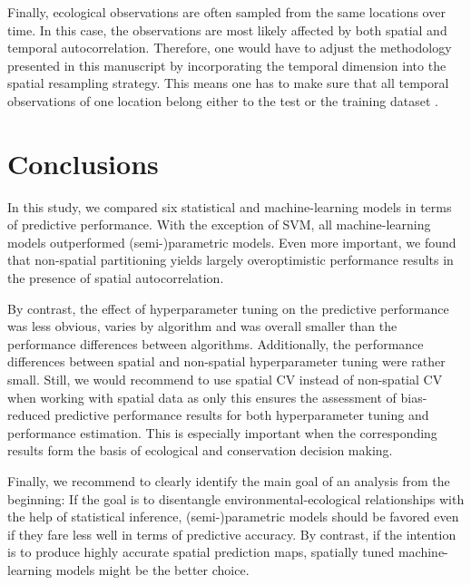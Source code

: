 \documentclass[review]{elsarticle}
\begin{document}
Finally, ecological observations are often sampled from the same locations over time.
In this case, the observations are most likely affected by both spatial and temporal autocorrelation.
Therefore, one would have to adjust the methodology presented in this manuscript by incorporating the temporal dimension into the spatial resampling strategy.
This means one has to make sure that all temporal observations of one location belong either to the test or the training dataset \citep{Meyer2018}.

\section{Conclusions}

\noindent In this study, we compared six statistical and machine-learning models in terms of predictive performance.
With the exception of SVM, all machine-learning models outperformed (semi-)parametric models.
Even more important, we found that non-spatial partitioning yields largely overoptimistic performance results in the presence of spatial autocorrelation.

By contrast, the effect of hyperparameter tuning on the predictive performance was less obvious, varies by algorithm and was overall smaller than the performance differences between algorithms.
Additionally, the performance differences between spatial and non-spatial hyperparameter tuning were rather small.
Still, we would recommend to use spatial \ac{CV} instead of non-spatial \ac{CV} when working with spatial data as only this ensures the assessment of bias-reduced predictive performance results for both hyperparameter tuning and performance estimation.
This is especially important when the corresponding results form the basis of ecological and conservation decision making.

Finally, we recommend to clearly identify the main goal of an analysis from the beginning:
If the goal is to disentangle environmental-ecological relationships with the help of statistical inference, (semi-)parametric models should be favored even if they fare less well in terms of predictive accuracy.
By contrast, if the intention is to produce highly accurate spatial prediction maps, spatially tuned machine-learning models might be the better choice.
\end{document}
